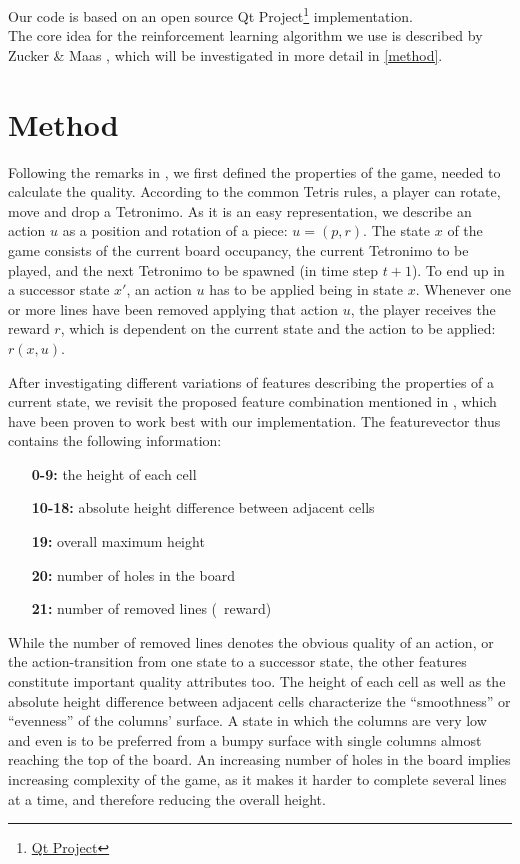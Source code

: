 \documentclass{ml}
\begin{document}
Our code is based on an open source Qt Project\footnote{\href{https://qt-project.org/doc/qt-4.8/widgets-tetrix.html}{Qt Project}} implementation. \\
The core idea for the reinforcement learning algorithm we use is described by Zucker \& Maas \cite{zucker2009learning}, which will be investigated in more detail in \autoref{method}.


\section{Method}
\label{method}

Following the remarks in \cite{zucker2009learning}, we first defined the properties of the game, needed to calculate the quality.
According to the common Tetris rules, a player can rotate, move and drop a Tetronimo. As it is an easy representation, we describe an action $u$ as a position and rotation of a piece: $u = (p,r)$. The state $x$ of the game consists of the current board occupancy, the current Tetronimo to be played, and the next Tetronimo to be spawned (in time step $t+1$). 
To end up in a successor state $x'$, an action $u$ has to be applied being in state $x$. 
Whenever one or more lines have been removed applying that action $u$, the player receives the reward $r$, which is dependent on the current state and the action to be applied: $r(x,u)$.

After investigating different variations of features describing the properties of a current state, we revisit the proposed feature combination mentioned in \cite{zucker2009learning}, which have been proven to work best with our implementation. 
The featurevector thus contains the following information:
\begin{enumerate}
	\item[\textbf{0-9:}] the height of each cell
	\item[\textbf{10-18:}] absolute height difference between adjacent cells
	\item[\textbf{19:}] overall maximum height 
	\item[\textbf{20:}] number of holes in the board
	\item[\textbf{21:}] number of removed lines (\Corresponds~reward)
\end{enumerate}
While the number of removed lines denotes the obvious quality of an action, or the action-transition from one state to a successor state, the other features constitute important quality attributes too. The height of each cell as well as the absolute height difference between adjacent cells characterize the ``smoothness'' or ``evenness'' of the columns' surface. A state in which the columns are very low and even is to be preferred from a bumpy surface with single columns almost reaching the top of the board. 
An increasing number of holes in the board implies increasing complexity of the game, as it makes it harder to complete several lines at a time, and therefore reducing the overall height. 
\end{document}
